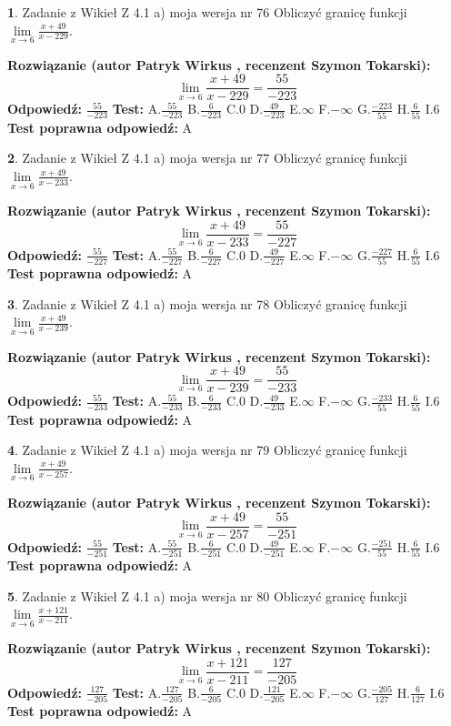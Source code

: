 \documentclass[12pt, a4paper]{article}
\theoremstyle{definition} %
\newtheorem{zad}{}
\newcommand{\zadStart}[1]{\begin{zad}#1\newline}
\newcommand{\zadStop}{\end{zad}}
\newcommand{\rozwStart}[2]{\noindent \textbf{Rozwiązanie (autor #1 , recenzent #2): }\newline}
\newcommand{\rozwStop}{\newline}
\newcommand{\odpStart}{\noindent \textbf{Odpowiedź:}\newline}
\newcommand{\odpStop}{\newline}
\newcommand{\testStart}{\noindent \textbf{Test:}\newline}
\newcommand{\testStop}{\newline}
\newcommand{\kluczStart}{\noindent \textbf{Test poprawna odpowiedź:}\newline}
\newcommand{\kluczStop}{\newline}
\begin{document}
\zadStart{Zadanie z Wikieł Z 4.1 a) moja wersja nr 76}
Obliczyć granicę funkcji $\lim\limits_{x\to6}\frac{x+49}{x-229}$.
\zadStop
\rozwStart{Patryk Wirkus}{Szymon Tokarski}
$$\lim\limits_{x\to6}\frac{x+49}{x-229} = \frac{55}{-223}$$
\rozwStop
\odpStart
$\frac{55}{-223}$
\odpStop
\testStart
A.$\frac{55}{-223}$
B.$\frac{6}{-223}$
C.$0$
D.$\frac{49}{-223}$
E.$\infty$
F.$-\infty$
G.$\frac{-223}{55}$
H.$\frac{6}{55}$
I.$6$
\testStop
\kluczStart
A
\kluczStop



\zadStart{Zadanie z Wikieł Z 4.1 a) moja wersja nr 77}
Obliczyć granicę funkcji $\lim\limits_{x\to6}\frac{x+49}{x-233}$.
\zadStop
\rozwStart{Patryk Wirkus}{Szymon Tokarski}
$$\lim\limits_{x\to6}\frac{x+49}{x-233} = \frac{55}{-227}$$
\rozwStop
\odpStart
$\frac{55}{-227}$
\odpStop
\testStart
A.$\frac{55}{-227}$
B.$\frac{6}{-227}$
C.$0$
D.$\frac{49}{-227}$
E.$\infty$
F.$-\infty$
G.$\frac{-227}{55}$
H.$\frac{6}{55}$
I.$6$
\testStop
\kluczStart
A
\kluczStop



\zadStart{Zadanie z Wikieł Z 4.1 a) moja wersja nr 78}
Obliczyć granicę funkcji $\lim\limits_{x\to6}\frac{x+49}{x-239}$.
\zadStop
\rozwStart{Patryk Wirkus}{Szymon Tokarski}
$$\lim\limits_{x\to6}\frac{x+49}{x-239} = \frac{55}{-233}$$
\rozwStop
\odpStart
$\frac{55}{-233}$
\odpStop
\testStart
A.$\frac{55}{-233}$
B.$\frac{6}{-233}$
C.$0$
D.$\frac{49}{-233}$
E.$\infty$
F.$-\infty$
G.$\frac{-233}{55}$
H.$\frac{6}{55}$
I.$6$
\testStop
\kluczStart
A
\kluczStop



\zadStart{Zadanie z Wikieł Z 4.1 a) moja wersja nr 79}
Obliczyć granicę funkcji $\lim\limits_{x\to6}\frac{x+49}{x-257}$.
\zadStop
\rozwStart{Patryk Wirkus}{Szymon Tokarski}
$$\lim\limits_{x\to6}\frac{x+49}{x-257} = \frac{55}{-251}$$
\rozwStop
\odpStart
$\frac{55}{-251}$
\odpStop
\testStart
A.$\frac{55}{-251}$
B.$\frac{6}{-251}$
C.$0$
D.$\frac{49}{-251}$
E.$\infty$
F.$-\infty$
G.$\frac{-251}{55}$
H.$\frac{6}{55}$
I.$6$
\testStop
\kluczStart
A
\kluczStop



\zadStart{Zadanie z Wikieł Z 4.1 a) moja wersja nr 80}
Obliczyć granicę funkcji $\lim\limits_{x\to6}\frac{x+121}{x-211}$.
\zadStop
\rozwStart{Patryk Wirkus}{Szymon Tokarski}
$$\lim\limits_{x\to6}\frac{x+121}{x-211} = \frac{127}{-205}$$
\rozwStop
\odpStart
$\frac{127}{-205}$
\odpStop
\testStart
A.$\frac{127}{-205}$
B.$\frac{6}{-205}$
C.$0$
D.$\frac{121}{-205}$
E.$\infty$
F.$-\infty$
G.$\frac{-205}{127}$
H.$\frac{6}{127}$
I.$6$
\testStop
\kluczStart
A
\kluczStop
\end{document}
